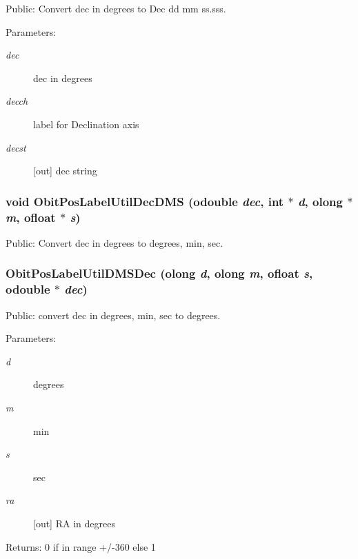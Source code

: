 Public: Convert dec in degrees to Dec dd mm ss.sss. 

\begin{Desc}
\item[Parameters:]
\begin{description}
\item[{\em dec}]dec in degrees \item[{\em decch}]label for Declination axis \item[{\em decst}][out] dec string \end{description}
\end{Desc}
\subsubsection{\setlength{\rightskip}{0pt plus 5cm}void Obit\-Pos\-Label\-Util\-Dec\-DMS ({\bf odouble} {\em dec}, int $\ast$ {\em d}, {\bf olong} $\ast$ {\em m}, {\bf ofloat} $\ast$ {\em s})}\label{ObitPosLabelUtil_8h_a4}


Public: Convert dec in degrees to degrees, min, sec. 

\subsubsection{ Obit\-Pos\-Label\-Util\-DMSDec ({\bf olong} {\em d}, {\bf olong} {\em m}, {\bf ofloat} {\em s}, {\bf odouble} $\ast$ {\em dec})}\label{ObitPosLabelUtil_8h_a6}


Public: convert dec in degrees, min, sec to degrees. 

\begin{Desc}
\item[Parameters:]
\begin{description}
\item[{\em d}]degrees \item[{\em m}]min \item[{\em s}]sec \item[{\em ra}][out] RA in degrees \end{description}
\end{Desc}
\begin{Desc}
\item[Returns:]0 if in range +/-360 else 1 \end{Desc}
